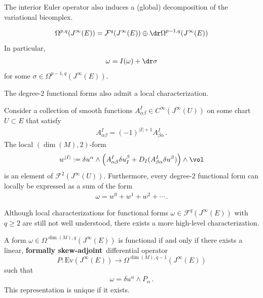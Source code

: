     The interior Euler operator also induces a (global) decomposition of the variational bicomplex.
    \begin{property}\label{var:functional_decomposition}
        \begin{gather}
            \Omega^{p,q}(J^\infty(E)) = \mathcal{F}^q(J^\infty(E)) \oplus \dr\Omega^{p-1,q}(J^\infty(E))
        \end{gather}
        In particular,
        \begin{gather}
            \omega = I(\omega) + \dr\sigma
        \end{gather}
        for some $\sigma\in\Omega^{p-1,q}(J^\infty(E))$.
    \end{property}

    The degree-$2$ functional forms also admit a local characterization.
    \begin{property}
        Consider a collection of smooth functions $A^I_{\alpha\beta}\in C^\infty(J^\infty(U))$ on some chart $U\subset E$ that satisfy
        \begin{gather}
            A^I_{\alpha\beta} = (-1)^{|I|+1}A^I_{\beta\alpha}\,.
        \end{gather}
        The local $(\dim(M),2)$-form
        \begin{gather}
            w^{|I|} := \delta u^\alpha\wedge\left(A^I_{\alpha\beta}\delta u^\beta_I + D_I(A^I_{\beta\alpha}\delta u^\beta)\right)\wedge\vol
        \end{gather}
        is an element of $\mathcal{F}^2(J^\infty(U))$. Furthermore, every degree-$2$ functional form can locally be expressed as a sum of the form
        \begin{gather}
            \omega = w^0 + w^1 + w^2 + \cdots\,.
        \end{gather}
    \end{property}

    Although local characterizations for functional forms $\omega\in\mathcal{F}^q(J^\infty(E))$ with $q\geq2$ are still not well understood, there exists a more high-level characterization.
    \begin{property}
        A form $\omega\in\Omega^{\dim(M),q}(J^\infty(E))$ is functional if and only if there exists a linear, \textbf{formally skew-adjoint}\footnotemark\ differential operator \[P:\mathrm{Ev}(J^\infty(E))\rightarrow\Omega^{\dim(M),q-1}(J^\infty(E))\] such that
        \begin{gather}
            \omega = \delta u^\alpha\wedge P_\alpha\,.
        \end{gather}
        This representation is unique if it exists.
    \end{property}


